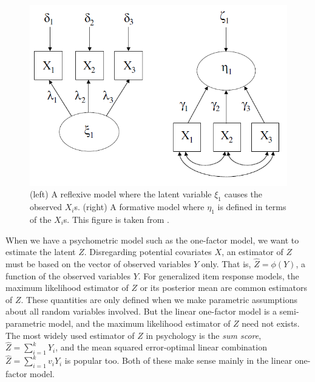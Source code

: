 \begin{figure}
\noindent \begin{centering}
\includegraphics[scale=0.5]{figures/borsboom}
\par\end{centering}

\caption{\label{fig:dag}(left) A reflexive model where the latent variable $\xi_{1}$ causes the observed $X_{i}$s. (right) A formative model where $\eta_{1}$ is defined in terms of the $X_{i}$s. This figure is taken from \textcite[p. 61]{Borsboom2005-iq}.}
\end{figure}

When we have a psychometric model such as the one-factor model, we want to estimate the latent $Z$. Disregarding potential covariates $X$, an estimator of $Z$ must be based on the vector of observed variables $Y$ only. That is, $\hat{Z}=\phi(Y)$, a function of the observed variables $Y$. For generalized item response models, the maximum likelihood estimator of $Z$ or its posterior mean are common estimators of $Z$. These quantities are only defined when we make parametric assumptions about all random variables involved. But the linear one-factor model is a semi-parametric model, and the maximum likelihood estimator of $Z$ need not exists. The most widely used estimator of $Z$ in psychology is the \emph{sum
score}, $\hat{Z}=\sum_{i=1}^{k}Y_{i}$, and the mean squared error-optimal linear combination $\hat{Z}=\sum_{i=1}^{k}v_{i}Y_{i}$ is popular too. Both of these make sense mainly in the linear one-factor model. 

